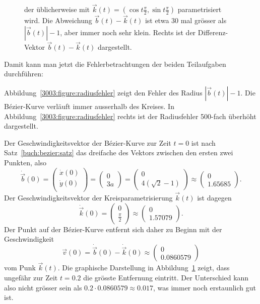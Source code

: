 \begin{loesung}
\begin{figure}
{der üblicherweise mit $\vec{k}(t)=(\cos t\frac{\pi}2,\sin t\frac{\pi}2)$
parametrisiert wird.
Die Abweichung $\vec{b}(t)-\vec{k}(t)$ ist etwa 30 mal grösser als
$|\vec{b}(t)|-1$, aber immer noch sehr klein.
Rechts ist der Differenz-Vektor $\vec{b}(t)-\vec{k}(t)$ dargestellt.
\label{3003:figure:abweichungen}}
\end{figure}
Damit kann man jetzt die Fehlerbetrachtungen der beiden Teilaufgaben
durchführen:
\begin{teilaufgaben}
\item
Abbildung~\ref{3003:figure:radiusfehler} zeigt den Fehler des
Radius $|\vec{b}(t)|-1$.
Die Bézier-Kurve verläuft immer ausserhalb des Kreises.
In Abbildung~\ref{3003:figure:radiusfehler} rechts ist der Radiusfehler
500-fach überhöht dargestellt.
\item
Der Geschwindigkeitsvektor der Bézier-Kurve zur Zeit $t=0$ ist nach
%
Satz~\ref{buch:bezier:satz} das dreifache des Vektors zwischen den ersten
zwei Punkten, also
\[
\dot{\vec{b}}(0)
=
\begin{pmatrix}
\dot{x}(0)\\
\dot{y}(0)\\
\end{pmatrix}
=
\begin{pmatrix}
0\\
3a
\end{pmatrix}
=
\begin{pmatrix}
0
\\
4(\sqrt{2}-1)
\end{pmatrix}
\approx
\begin{pmatrix}
0
\\
1.65685
\end{pmatrix}.
\]
Der Geschwindigkeitsvektor der Kreisparametrisierung $\vec{k}(t)$ ist
%
dagegen
\[
\dot{\vec{k}}(0)
=
\begin{pmatrix}
0\\\frac\pi2
\end{pmatrix}
\approx
\begin{pmatrix}
0\\
1.57079
\end{pmatrix}.
\]
Der Punkt auf der Bézier-Kurve entfernt sich daher zu Beginn mit der
Geschwindigkeit
\[
\vec{v}(0)
=
\dot{\vec{b}}(0) - \dot{\vec{k}}(0)
\approx
\begin{pmatrix}
0
\\
0.0860579
\end{pmatrix}
\]
vom Punk $\vec{k}(t)$.
Die graphische Darstellung in Abbildung~\ref{3003:figure:abweichungen}
zeigt, dass ungefähr zur Zeit $t=0.2$ die grösste Entfernung eintritt.
Der Unterschied kann also nicht grösser sein als
$0.2\cdot 0.0860579\approx 0.017$, was immer noch erstaunlich gut ist.
\qedhere
\end{teilaufgaben}
\end{loesung}
